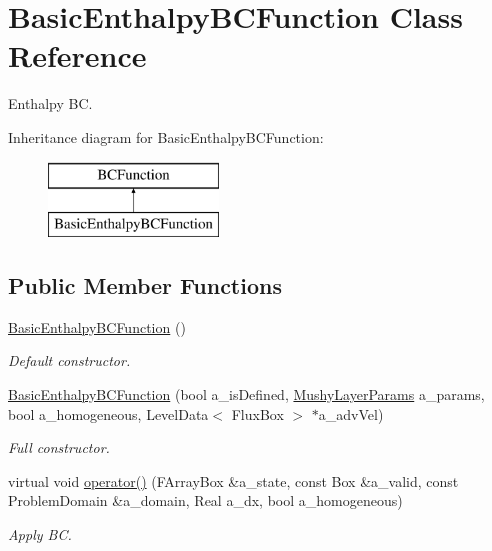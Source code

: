 \hypertarget{class_basic_enthalpy_b_c_function}{\section{Basic\-Enthalpy\-B\-C\-Function Class Reference}
\label{class_basic_enthalpy_b_c_function}
}


Enthalpy B\-C.  


Inheritance diagram for Basic\-Enthalpy\-B\-C\-Function\-:\begin{figure}[H]
\begin{center}
\leavevmode
\includegraphics[height=2.000000cm]{class_basic_enthalpy_b_c_function}
\end{center}
\end{figure}
\subsection*{Public Member Functions}
\begin{DoxyCompactItemize}
\item 
\hypertarget{class_basic_enthalpy_b_c_function_a357df48b155ef7c6d0a70cd5bae5e294}{\hyperlink{class_basic_enthalpy_b_c_function_a357df48b155ef7c6d0a70cd5bae5e294}{Basic\-Enthalpy\-B\-C\-Function} ()}\label{class_basic_enthalpy_b_c_function_a357df48b155ef7c6d0a70cd5bae5e294}

\begin{DoxyCompactList}\small\item\em Default constructor. \end{DoxyCompactList}\item 
\hypertarget{class_basic_enthalpy_b_c_function_a6a00b3e6c21815e10e3a9377a1550446}{\hyperlink{class_basic_enthalpy_b_c_function_a6a00b3e6c21815e10e3a9377a1550446}{Basic\-Enthalpy\-B\-C\-Function} (bool a\-\_\-is\-Defined, \hyperlink{class_mushy_layer_params}{Mushy\-Layer\-Params} a\-\_\-params, bool a\-\_\-homogeneous, Level\-Data$<$ Flux\-Box $>$ $\ast$a\-\_\-adv\-Vel)}\label{class_basic_enthalpy_b_c_function_a6a00b3e6c21815e10e3a9377a1550446}

\begin{DoxyCompactList}\small\item\em Full constructor. \end{DoxyCompactList}\item 
\hypertarget{class_basic_enthalpy_b_c_function_acb51d9f00ea4659aa22d63e8c0200626}{virtual void \hyperlink{class_basic_enthalpy_b_c_function_acb51d9f00ea4659aa22d63e8c0200626}{operator()} (F\-Array\-Box \&a\-\_\-state, const Box \&a\-\_\-valid, const Problem\-Domain \&a\-\_\-domain, Real a\-\_\-dx, bool a\-\_\-homogeneous)}\label{class_basic_enthalpy_b_c_function_acb51d9f00ea4659aa22d63e8c0200626}

\begin{DoxyCompactList}\small\item\em Apply B\-C. \end{DoxyCompactList}\end{DoxyCompactItemize}

